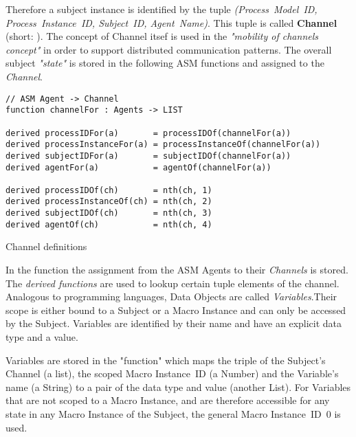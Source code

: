 Therefore a subject instance is identified by the tuple \textit{(Process~Model~ID, Process~Instance~ID, Subject~ID, Agent~Name)}. This tuple is called \textbf{Channel} (short: ). The concept of Channel itsef is used in the \textit{"mobility of channels concept"} in order to support distributed communication patterns. The overall subject \textit{"state"} is stored in the following ASM functions and assigned to the \textit{Channel}.

\begin{listing}[htbp]
\begin{verbatim}
// ASM Agent -> Channel
function channelFor : Agents -> LIST

derived processIDFor(a)       = processIDOf(channelFor(a))
derived processInstanceFor(a) = processInstanceOf(channelFor(a))
derived subjectIDFor(a)       = subjectIDOf(channelFor(a))
derived agentFor(a)           = agentOf(channelFor(a))

derived processIDOf(ch)       = nth(ch, 1)
derived processInstanceOf(ch) = nth(ch, 2)
derived subjectIDOf(ch)       = nth(ch, 3)
derived agentOf(ch)           = nth(ch, 4)
\end{verbatim}
\caption{Channel definitions}
\label{lst:shortasm:channelFor}
\end{listing}

In the function  the assignment from the ASM Agents to their \textit{Channels} is stored.
The \textit{derived functions} are used to lookup certain tuple elements of the channel.\\



Analogous to programming languages, Data Objects are called \textit{Variables}.Their scope is either bound to a Subject or a Macro Instance and can only be accessed by the Subject. Variables are identified by their name and have an explicit data type and a value.

Variables are stored in the  "function" which maps the triple of the Subject's Channel (a list), the scoped Macro Instance~ID (a Number) and the Variable's name (a String) to a pair of the data type and value (another List). For Variables that are not scoped to a Macro Instance, and are therefore accessible for any state in any Macro Instance of the Subject, the general Macro Instance~ID~$0$ is used.

